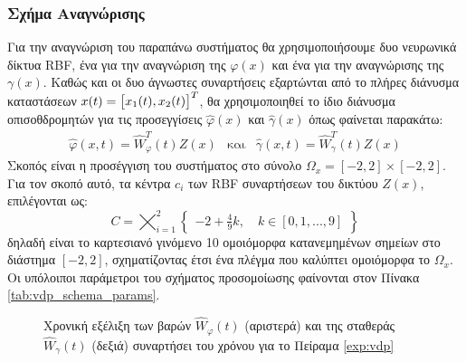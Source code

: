 {\subsubsection{Σχήμα Αναγνώρισης}
Για την αναγνώριση του παραπάνω συστήματος θα χρησιμοποιήσουμε δυο νευρωνικά δίκτυα RBF, ένα για την αναγνώριση της $\varphi(x)$ και ένα για την αναγνώρισης της  $\gamma(x)$. Καθώς και οι δυο άγνωστες συναρτήσεις εξαρτώνται από το πλήρες διάνυσμα καταστάσεων $x(t) =\bmqty{x_1(t),x_2(t)}^T$, θα χρησιμοποιηθεί το ίδιο διάνυσμα οπισοθδρομητών για τις προσεγγίσεις $\hat{\varphi}(x)$ και $\hat{\gamma}(x)$ όπως φαίνεται παρακάτω:
\begin{equation*}
\begin{matrix}
\hat{\varphi}(x,t)  = \hat{W}_{\varphi}^T(t) Z(x) & \text{και} & \hat{\gamma}(x,t) = \hat{W}_{\gamma}^T(t) Z(x) 
\end{matrix}
\end{equation*}
Σκοπός είναι η προσέγγιση του συστήματος στο σύνολο $\Omega_x = [-2,2] \times [-2,2] $. Για τον σκοπό αυτό, τα κέντρα $c_i$ των RBF συναρτήσεων του δικτύου $Z(x)$, επιλέγονται ως:
\begin{equation*}
	C =
	\bigtimes_{i = 1}^{2}
	 \begin{Bmatrix}
	-2 +  \frac{4}{9}k, \quad  k \in [0,1,...,9]
	\end{Bmatrix} 
\end{equation*}
δηλαδή είναι το καρτεσιανό γινόμενο 10 ομοιόμορφα κατανεμημένων σημείων στο διάστημα $[-2,2]$, σχηματίζοντας έτσι ένα πλέγμα που καλύπτει ομοιόμορφα το $\Omega_x$. Οι υπόλοιποι παράμετροι του σχήματος προσομοίωσης φαίνονται στον Πίνακα \ref{tab:vdp_schema_params}.

\begin{figure}
	\begin{subfigure}{0.5\textwidth}
		
	\end{subfigure}
	\begin{subfigure}{0.5\textwidth}
		
	\end{subfigure}
	\caption{ Χρονική εξέλιξη των βαρών $\hat{W}_\varphi(t)$ (αριστερά) και της σταθεράς $\hat{W}_{\gamma}(t)$ (δεξιά) συναρτήσει του χρόνου για το Πείραμα \ref{exp:vdp}}
	\label{fig:vdp_weights}
\end{figure}

}
